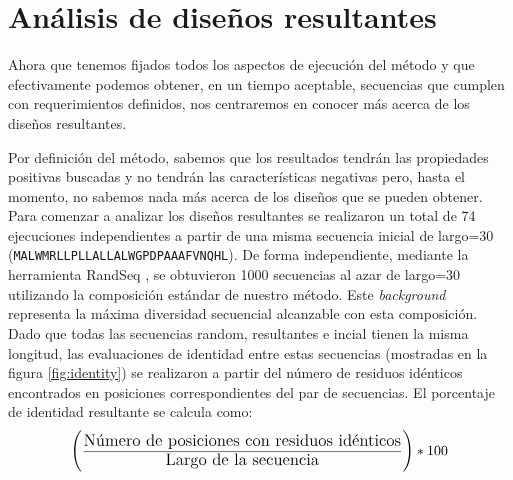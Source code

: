 \section{Análisis de diseños resultantes}

Ahora que tenemos fijados todos los aspectos de ejecución del método y que efectivamente podemos obtener, en un tiempo aceptable, secuencias que cumplen con requerimientos definidos, nos centraremos en 
conocer más acerca de los diseños resultantes.



Por definición del método, sabemos que los resultados tendrán las propiedades positivas buscadas y no tendrán las características negativas pero, hasta el momento, no sabemos nada más acerca de los diseños que se pueden obtener.
Para comenzar a analizar los diseños resultantes se realizaron un total de 74 ejecuciones independientes a partir de una misma secuencia inicial de largo=30 (\texttt{MALWMRLLPLLALLALWGPDPAAAFVNQHL}).
De forma independiente, mediante la herramienta RandSeq \cite{randseq}, se obtuvieron 1000 secuencias al azar de largo=30 utilizando la composición estándar de nuestro método.
Este \textit{background} representa la máxima diversidad secuencial alcanzable con esta composición.
Dado que todas las secuencias random, resultantes e incial tienen la misma longitud, las evaluaciones de identidad entre estas secuencias (mostradas en la figura \ref{fig:identity}) 
se realizaron a partir del número de residuos idénticos encontrados en posiciones correspondientes del par de secuencias. 
El porcentaje de identidad resultante se calcula como: 
\begin{equation}
 \large \bigg(\frac{\text{Número de posiciones con residuos idénticos}}{\text{Largo de la secuencia}}\bigg)*100
\end{equation}

